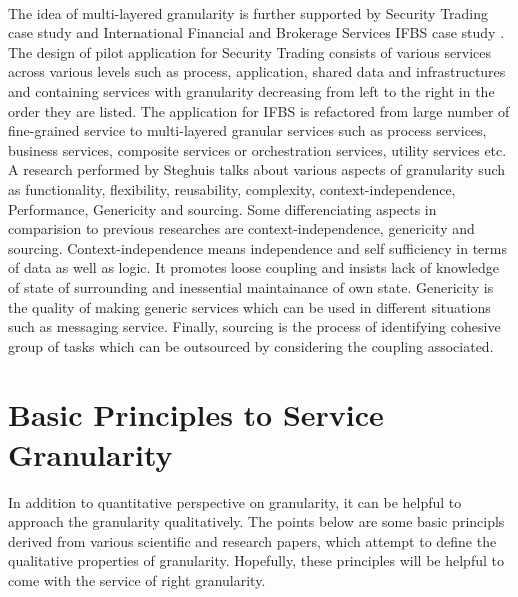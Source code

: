 \\
The idea of multi-layered granularity is further supported by Security Trading case study \cite{Abdelkarim-Erradi:2006aa} and International Financial and Brokerage Services \acrshort{IFBS} case study \cite{Naveen-Kulkarni:2008aa}. The design of pilot application for Security Trading consists of various services across various levels such as process, application, shared data and infrastructures and containing services with granularity decreasing from left to the right in the order they are listed. The application for IFBS is refactored from large number of fine-grained service to multi-layered granular services such as process services, business services, composite services or orchestration services, utility services etc.
\\
A research performed by Steghuis \cite{Steghuis:2006aa} talks about various aspects of granularity such as functionality, flexibility, reusability, complexity, context-independence, Performance, Genericity and sourcing. Some differenciating aspects in comparision to previous researches are context-independence, genericity and sourcing. Context-independence means independence and self sufficiency in terms of data as well as logic. It promotes loose coupling and insists lack of knowledge of state of surrounding and inessential maintainance of own state. Genericity is the quality of making generic services which can be used in different situations such as messaging service. Finally, sourcing is the process of identifying cohesive group of tasks which can be outsourced by considering the coupling associated.

\section{Basic Principles to Service Granularity}\label{section:granularity/principles}
In addition to quantitative perspective on granularity, it can be helpful to approach the granularity qualitatively. The points below are some basic principls derived from various scientific and research papers, which attempt to define the qualitative properties of granularity. Hopefully, these principles will be helpful to come with the service of right granularity.

